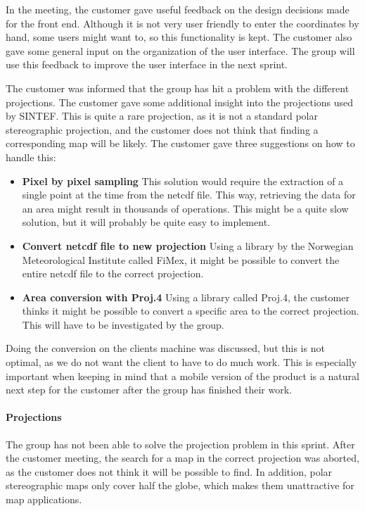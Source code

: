 \documentclass[11pt,a4paper,titlepage,oneside]{report}
\begin{document}
In the meeting, the customer gave useful feedback on the design decisions made for the front end. Although it is not very user friendly to enter the coordinates by hand, some users might want to, so this functionality is kept. The customer also gave some general input on the organization of the user interface. The group will use this feedback to improve the user interface in the next sprint. 

The customer was informed that the group has hit a problem with the different projections. The customer gave some additional insight into the projections used by SINTEF. This is quite a rare projection, as it is not a standard polar stereographic projection, and the customer does not think that finding a corresponding map will be likely. The customer gave three suggestions on how to handle this:
\begin{itemize}
\item \textbf{Pixel by pixel sampling} This solution would require the extraction of a single point at the time from the \gls{netcdf} file. This way, retrieving the data for an area might result in thousands of operations. This might be a quite slow solution, but it will probably be quite easy to implement.
\item \textbf{Convert \gls{netcdf} file to new projection} Using a library by the Norwegian Meteorological Institute called FiMex, it might be possible to convert the entire \gls{netcdf} file to the correct projection. 
\item \textbf{Area conversion with Proj.4} Using a library called Proj.4, the customer thinks it might be possible to convert a specific area to the correct projection. This will have to be investigated by the group.
\end{itemize}

Doing the conversion on the clients machine was discussed, but this is not optimal, as we do not want the client to have to do much work. This is especially important when keeping in mind that a mobile version of the product is a natural next step for the customer after the group has finished their work.

\paragraph{Projections}
The group has not been able to solve the projection problem in this sprint. After the customer meeting, the search for a map in the correct projection was aborted, as the customer does not think it will be possible to find. In addition, polar stereographic maps only cover half the globe, which makes them unattractive for map applications. 
\end{document}

